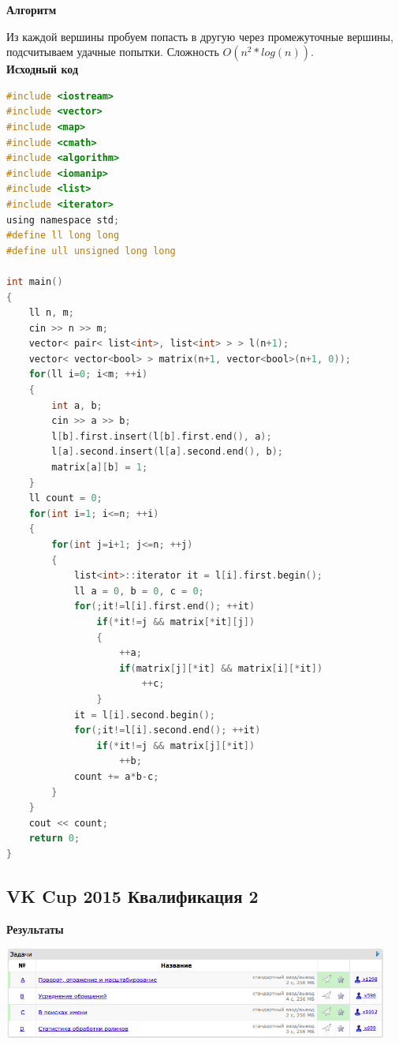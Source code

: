 \documentclass[a4paper,12pt]{article}
\begin{document}
\textbf{{\large Алгоритм}}

Из каждой вершины пробуем попасть в другую через промежуточные вершины, подсчитываем удачные попытки. Сложность $O(n^2*log(n))$. \\

\textbf{{\large Исходный код}} \\
\begin{lstlisting}[language=C]
#include <iostream>
#include <vector>
#include <map>
#include <cmath>
#include <algorithm>
#include <iomanip>
#include <list>
#include <iterator>
using namespace std;
#define ll long long
#define ull unsigned long long

int main()
{
    ll n, m;
    cin >> n >> m;
    vector< pair< list<int>, list<int> > > l(n+1);
    vector< vector<bool> > matrix(n+1, vector<bool>(n+1, 0));
    for(ll i=0; i<m; ++i)
    {
        int a, b;
        cin >> a >> b;
        l[b].first.insert(l[b].first.end(), a);
        l[a].second.insert(l[a].second.end(), b);
        matrix[a][b] = 1;
    }
    ll count = 0;
    for(int i=1; i<=n; ++i)
    {
        for(int j=i+1; j<=n; ++j)
        {
            list<int>::iterator it = l[i].first.begin();
            ll a = 0, b = 0, c = 0;
            for(;it!=l[i].first.end(); ++it)
                if(*it!=j && matrix[*it][j])
                {
                    ++a;
                    if(matrix[j][*it] && matrix[i][*it])
                        ++c;
                }
            it = l[i].second.begin();
            for(;it!=l[i].second.end(); ++it)
                if(*it!=j && matrix[j][*it])
                    ++b;
            count += a*b-c;
        }
    }
    cout << count;
    return 0;
}
\end{lstlisting}



%
%

\newpage
\subsection{VK Cup 2015 Квалификация 2}

\textbf{{\large Результаты}} \\
\begin{center}
\includegraphics[width=0.95\textwidth]{VK_Qual_2/A_VK_Qual_result.png}\\ [1cm]
\end{center}
\end{document}

